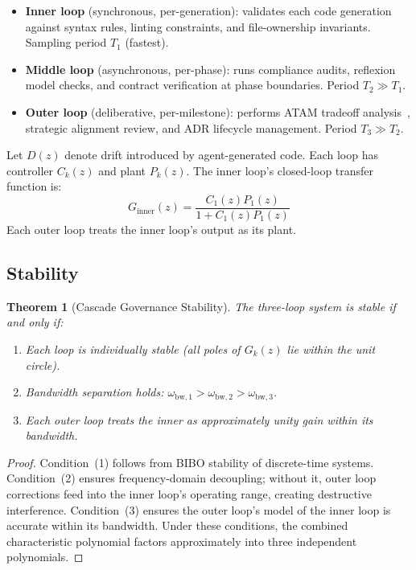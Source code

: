 \documentclass[11pt, a4paper, copyright]{googledeepmind}
\newtheorem{theorem}{Theorem}[section]
\begin{document}
\begin{itemize}
    \item \textbf{Inner loop} (synchronous, per-generation): validates each code generation against syntax rules, linting constraints, and file-ownership invariants. Sampling period $T_1$ (fastest).
    \item \textbf{Middle loop} (asynchronous, per-phase): runs compliance audits, reflexion model checks, and contract verification at phase boundaries. Period $T_2 \gg T_1$.
    \item \textbf{Outer loop} (deliberative, per-milestone): performs ATAM tradeoff analysis~\citep{kazman2000}, strategic alignment review, and ADR lifecycle management. Period $T_3 \gg T_2$.
\end{itemize}

Let $D(z)$ denote drift introduced by agent-generated code. Each loop has controller $C_k(z)$ and plant $P_k(z)$. The inner loop's closed-loop transfer function is:
\begin{equation}
    G_{\mathrm{inner}}(z) = \frac{C_1(z) P_1(z)}{1 + C_1(z) P_1(z)}
\end{equation}
Each outer loop treats the inner loop's output as its plant.

\subsection{Stability}

\begin{theorem}[Cascade Governance Stability]
\label{thm:cascade}
The three-loop system is stable if and only if:
\begin{enumerate}
    \item Each loop is individually stable (all poles of $G_k(z)$ lie within the unit circle).
    \item Bandwidth separation holds: $\omega_{\mathrm{bw},1} > \omega_{\mathrm{bw},2} > \omega_{\mathrm{bw},3}$.
    \item Each outer loop treats the inner as approximately unity gain within its bandwidth.
\end{enumerate}
\end{theorem}

\begin{proof}
Condition~(1) follows from BIBO stability of discrete-time systems. Condition~(2) ensures frequency-domain decoupling; without it, outer loop corrections feed into the inner loop's operating range, creating destructive interference. Condition~(3) ensures the outer loop's model of the inner loop is accurate within its bandwidth. Under these conditions, the combined characteristic polynomial factors approximately into three independent polynomials.
\end{proof}
\end{document}
